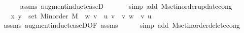 \begin{isabellebody}
\ \ \ \ \isamarkupfalse%
\ assms\ augment{\isacharunderscore}{\kern0pt}induct{\isacharunderscore}{\kern0pt}case{\isacharunderscore}{\kern0pt}{}D{\isacharparenleft}{\kern0pt}{}{\isacharcomma}{\kern0pt}\ {}{}{\isacharparenright}{\kern0pt}\isanewline
\ \ \ \ \isamarkupfalse%
\ {\isacharparenleft}{\kern0pt}simp\ add{\isacharcolon}{\kern0pt}\ M{\isachardot}{\kern0pt}set{\isacharunderscore}{\kern0pt}inorder{\isacharunderscore}{\kern0pt}update{\isacharunderscore}{\kern0pt}cong{\isacharparenright}{\kern0pt}\isanewline
\ \ \isamarkupfalse%
\ \isamarkupfalse%
\ {\isachardoublequoteopen}{\isachardot}{\kern0pt}{\isachardot}{\kern0pt}{\isachardot}{\kern0pt}\ {\isasymlongleftrightarrow}\ {\isacharparenleft}{\kern0pt}x{\isacharcomma}{\kern0pt}\ y{\isacharparenright}{\kern0pt}\ {\isasymin}\ set\ {\isacharparenleft}{\kern0pt}M{\isacharunderscore}{\kern0pt}inorder\ M{\isacharparenright}{\kern0pt}\ {\isacharminus}{\kern0pt}\ {\isacharbraceleft}{\kern0pt}{\isacharparenleft}{\kern0pt}w{\isacharcomma}{\kern0pt}\ v{\isacharparenright}{\kern0pt}{\isacharbraceright}{\kern0pt}\ {\isasymunion}\ {\isacharbraceleft}{\kern0pt}{\isacharparenleft}{\kern0pt}u{\isacharcomma}{\kern0pt}\ v{\isacharparenright}{\kern0pt}{\isacharbraceright}{\kern0pt}\ {\isacharminus}{\kern0pt}\ {\isacharbraceleft}{\kern0pt}{\isacharparenleft}{\kern0pt}v{\isacharcomma}{\kern0pt}\ w{\isacharparenright}{\kern0pt}{\isacharbraceright}{\kern0pt}\ {\isasymunion}\ {\isacharbraceleft}{\kern0pt}{\isacharparenleft}{\kern0pt}v{\isacharcomma}{\kern0pt}\ u{\isacharparenright}{\kern0pt}{\isacharbraceright}{\kern0pt}{\isachardoublequoteclose}\isanewline
\ \ \ \ \isamarkupfalse%
\ assms{\isacharparenleft}{\kern0pt}{}{\isacharparenright}{\kern0pt}\ augment{\isacharunderscore}{\kern0pt}induct{\isacharunderscore}{\kern0pt}case{\isacharunderscore}{\kern0pt}{}D{\isacharparenleft}{\kern0pt}{}{}{\isacharparenright}{\kern0pt}{\isacharbrackleft}{\kern0pt}OF\ assms{\isacharbrackright}{\kern0pt}\isanewline
\ \ \ \ \isamarkupfalse%
\ {\isacharparenleft}{\kern0pt}simp\ add{\isacharcolon}{\kern0pt}\ M{\isachardot}{\kern0pt}set{\isacharunderscore}{\kern0pt}inorder{\isacharunderscore}{\kern0pt}delete{\isacharunderscore}{\kern0pt}cong{\isacharparenright}{\kern0pt}\isanewline
\ \ \isamarkupfalse%
\ \isamarkupfalse%

\end{isabellebody}
